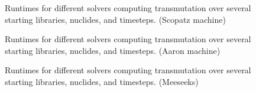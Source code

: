 \begin{figure}[!ht]
\centering
\resizebox{0.9\textwidth}{!}{}
\caption{Runtimes for different solvers computing transmutation over several starting libraries, nuclides, and timesteps.
(Scopatz machine)}
\label{fig:origen-scopatz}
\end{figure}

\begin{figure}[!ht]
\centering
\resizebox{0.9\textwidth}{!}{}
\caption{Runtimes for different solvers computing transmutation over several starting libraries, nuclides, and timesteps.
 (Aaron machine)}
\label{fig:origen-aaron}
\end{figure}

\begin{figure}[!ht]
\centering
\resizebox{0.9\textwidth}{!}{}
\caption{Runtimes for different solvers computing transmutation over several starting libraries, nuclides, and timesteps.
 (Meeseeks)}
\label{fig:origen-meeseeks}
\end{figure}
